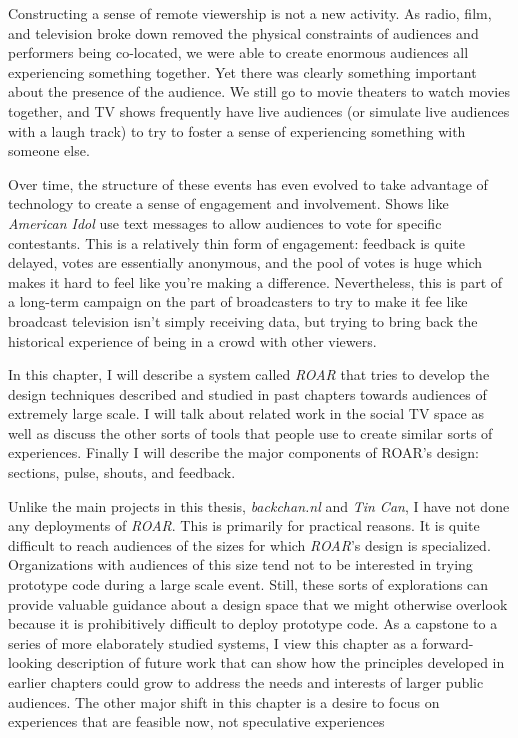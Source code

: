 Constructing a sense of remote viewership is not a new activity. As radio, film, and television broke down removed the physical constraints of audiences and performers being co-located, we were able to create enormous audiences all experiencing something together. Yet there was clearly something important about the presence of the audience. We still go to movie theaters to watch movies together, and TV shows frequently have live audiences (or simulate live audiences with a laugh track) to try to foster a sense of experiencing something with someone else.

Over time, the structure of these events has even evolved to take advantage of technology to create a sense of engagement and involvement. Shows like \emph{American Idol} use text messages to allow audiences to vote for specific contestants. This is a relatively thin form of engagement: feedback is quite delayed, votes are essentially anonymous, and the pool of votes is huge which makes it hard to feel like you're making a difference. Nevertheless, this is part of a long-term campaign on the part of broadcasters to try to make it fee like broadcast television isn't simply receiving data, but trying to bring back the historical experience of being in a crowd with other viewers.

In this chapter, I will describe a system called \emph{ROAR} that tries to develop the design techniques described and studied in past chapters towards audiences of extremely large scale. I will talk about related work in the social TV space as well as discuss the other sorts of tools that people use to create similar sorts of experiences. Finally I will describe the major components of ROAR's design: sections, pulse, shouts, and feedback. 

Unlike the main projects in this thesis, \emph{backchan.nl} and \emph{Tin Can}, I have not done any deployments of \emph{ROAR}. This is primarily for practical reasons. It is quite difficult to reach audiences of the sizes for which \emph{ROAR}'s design is specialized. Organizations with audiences of this size tend not to be interested in trying prototype code during a large scale event. Still, these sorts of explorations can provide valuable guidance about a design space that we might otherwise overlook because it is prohibitively difficult to deploy prototype code. As a capstone to a series of more elaborately studied systems, I view this chapter as a forward-looking description of future work that can show how the principles developed in earlier chapters could grow to address the needs and interests of larger public audiences. The other major shift in this chapter is a desire to focus on experiences that are feasible now, not speculative experiences 



